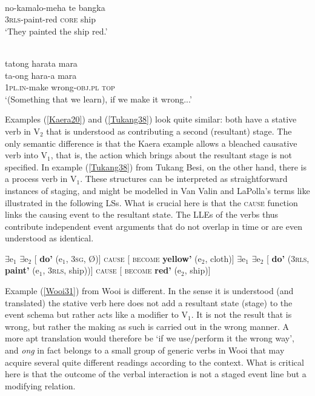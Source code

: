 {\ea \label{Tukang38}
\\
\gll no-kamalo-meha te bangka \\
3\textsc{rls}-paint-red \textsc{core} ship \\
\glft `They painted the ship red.' \\ 
\z

\ea \label{Wooi31}
\\
\glll tatong harata mara \\
ta-ong hara-a mara \\
1\textsc{pl}.\textsc{in}-make wrong-\textsc{obj}.\textsc{pl} \textsc{top}\\
\glft `(Something that we learn), if we make it wrong...' \\ 
\z

Examples (\ref{Kaera20}) and (\ref{Tukang38}) look quite similar: both have a stative verb in V$_2$ that is understood as contributing a second (resultant) stage. The only semantic difference is that the Kaera example allows a bleached causative verb into V$_1$, that is, the action which brings about the resultant stage is not specified. In example (\ref{Tukang38}) from Tukang Besi, on the other hand, there is a process verb in V$_1$. These structures can be interpreted as straightforward instances of staging, and might be modelled in Van Valin and LaPolla's terms like illustrated in the following LSs. What is crucial here is that the \textsc{cause} function links the causing event to the resultant state. The LLEs of the verbs thus contribute independent event arguments that do not overlap in time or are even understood as identical.

\ea
\ea \label{Kaera20_LS} $\exists$e$_1$ $\exists$e$_2$ [ \textbf{do'} (e$_1$, 3\textsc{sg}, Ø)] \textsc{cause} [ \textsc{become} \textbf{yellow'} (e$_2$, cloth)]
\ex \label{Tukang38_LS} $\exists$e$_1$ $\exists$e$_2$ [ \textbf{do'} (3\textsc{rls}, \textbf{paint'} (e$_1$, 3\textsc{rls}, ship))] \textsc{cause} [ \textsc{become} \textbf{red'} (e$_2$, ship)]
\z
\z

Example (\ref{Wooi31}) from Wooi is different. In the sense it is understood (and translated) the stative verb here does not add a resultant state (stage) to the event schema but rather acts like a modifier to V$_1$. It is not the result that is wrong, but rather the making as such is carried out in the wrong manner. A more apt translation would therefore be `if we use/perform it the wrong way', and \textit{ong} in fact belongs to a small group of generic verbs in Wooi that may acquire several quite different readings according to the context. What is critical here is that the outcome of the verbal interaction is not a staged event line but a modifying relation. 

}

